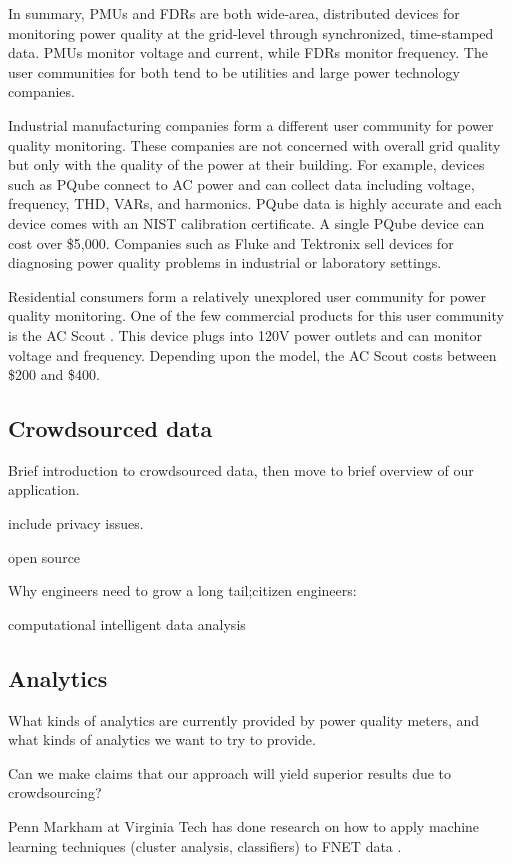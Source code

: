 In summary, PMUs and FDRs are both wide-area, distributed devices for monitoring power quality at the grid-level through synchronized, time-stamped data. PMUs monitor voltage and current, while FDRs monitor frequency.  The user communities for both tend to be utilities and large power technology companies. 

Industrial manufacturing companies form a different user community for power quality monitoring. These companies are not concerned with overall grid quality but only with the quality of the power at their building.  For example, devices such as PQube \cite{pqube} connect to AC power and can collect data including voltage, frequency, THD, VARs, and harmonics. PQube data is highly accurate and each device comes with an NIST calibration certificate. A single PQube device can cost over \$5,000.   Companies such as Fluke and Tektronix sell devices for diagnosing power quality problems in industrial or laboratory settings. 

Residential consumers form a relatively unexplored user community for power quality monitoring.   One of the few commercial products for this user community is the AC Scout \cite{acscout}.  This device plugs into 120V power outlets and can monitor voltage and frequency.  Depending upon the model, the AC Scout costs between \$200 and \$400. 









\subsection*{Crowdsourced data}

Brief introduction to crowdsourced data, then move to brief overview of our application. 

include privacy issues.

open source

Why engineers need to grow a long tail;citizen engineers:

computational intelligent data analysis

\subsection*{Analytics}

What kinds of analytics are currently provided by power quality meters, and what kinds of analytics we want to try to provide.   

Can we make claims that our approach will yield superior results due to crowdsourcing? 

Penn Markham at Virginia Tech has done research on how to apply machine learning techniques (cluster analysis, classifiers) to FNET data \cite{Markham2012}. 



